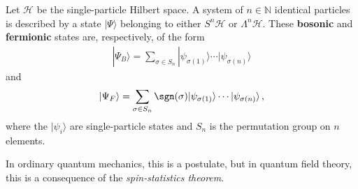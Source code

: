     \begin{axiom}
        Let $\mathcal{H}$ be the single-particle Hilbert space. A system of $n\in\mathbb{N}$ identical particles is described by a state $|\Psi\rangle$ belonging to either $S^n\mathcal{H}$ or $\Lambda^n\mathcal{H}$. These \textbf{bosonic} and \textbf{fermionic} states are, respectively, of the form
        \begin{gather}
            |\Psi_B\rangle = \sum_{\sigma\in S_n}|\psi_{\sigma(1)}\rangle\cdots|\psi_{\sigma(n)}\rangle
        \end{gather}
        and
        \begin{gather}
            |\Psi_F\rangle = \sum_{\sigma\in S_n}\sgn(\sigma)|\psi_{\sigma(1)}\rangle\cdots|\psi_{\sigma(n)}\rangle\,,
        \end{gather}
        where the $|\psi_i\rangle$ are single-particle states and $S_n$ is the permutation group on $n$ elements.
    \end{axiom}
    \begin{remark}
        In ordinary quantum mechanics, this is a postulate, but in quantum field theory, this is a consequence of the \textit{spin-statistics theorem}.
    \end{remark}


\section{}

